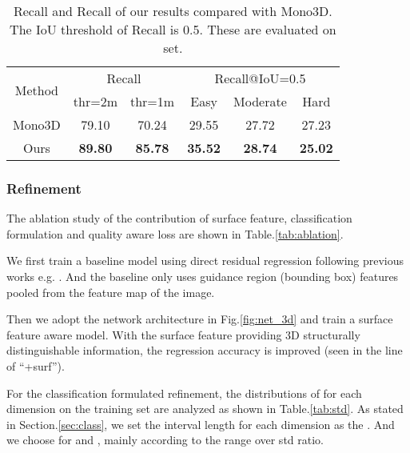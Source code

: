 \documentclass[10pt,twocolumn,letterpaper]{article}
\begin{document}
\begin{table}[!ht]
\setlength{\tabcolsep}{1mm}
\footnotesize
\begin{center}
\begin{tabular}{| c || c | c || c | c | c |}
\hline
\multirow{2}{*}{Method} & \multicolumn{2}{c||}{Recall} & \multicolumn{3}{c|}{Recall@IoU=0.5} \\
\cline{2-6}
& thr=2m & thr=1m & Easy & Moderate & Hard \\
\hline
Mono3D \cite{mono3d} & 79.10 & 70.24 & 29.55 & 27.72 & 27.23 \\
Ours & \textbf{89.80} & \textbf{85.78} & \textbf{35.52} & \textbf{28.74} & \textbf{25.02} \\
\hline
\end{tabular}
\vspace{1mm}
\caption{Recall and Recall of our results compared with Mono3D. The IoU threshold of Recall is 0.5. These are evaluated on  set.}
\label{tab:guidance}
\end{center}
\end{table}


\subsubsection{Refinement}
The ablation study of the contribution of surface feature, classification formulation and quality aware loss are shown in Table.\ref{tab:ablation}.

We first train a baseline model using direct residual regression following previous works e.g. \cite{3dop,mfusion}. And the baseline only uses guidance region (bounding box) features pooled from the feature map of the image.

Then we adopt the network architecture in Fig.\ref{fig:net_3d} and train a surface feature aware model. With the surface feature providing 3D structurally distinguishable information, the regression accuracy is improved (seen in the line of ``+surf'').

For the classification formulated refinement, the distributions of  for each dimension on the training set are analyzed as shown in Table.\ref{tab:std}. As stated in Section.\ref{sec:class}, we set the interval length for each dimension as the . And we choose  for  and , mainly according to the range over std ratio.
\end{document}
